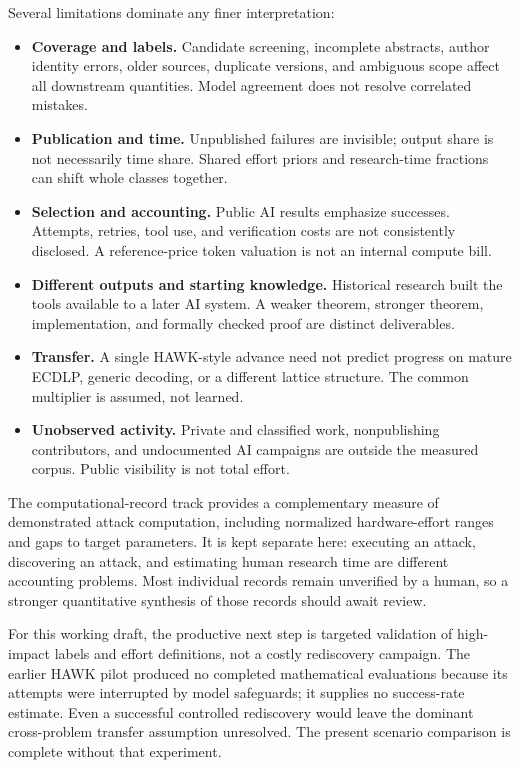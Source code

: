 \documentclass[11pt,letterpaper]{article}
\begin{document}
Several limitations dominate any finer interpretation:
\begin{itemize}
\item \textbf{Coverage and labels.} Candidate screening, incomplete abstracts, author identity errors, older sources, duplicate versions, and ambiguous scope affect all downstream quantities. Model agreement does not resolve correlated mistakes.
\item \textbf{Publication and time.} Unpublished failures are invisible; output share is not necessarily time share. Shared effort priors and research-time fractions can shift whole classes together.
\item \textbf{Selection and accounting.} Public AI results emphasize successes. Attempts, retries, tool use, and verification costs are not consistently disclosed. A reference-price token valuation is not an internal compute bill.
\item \textbf{Different outputs and starting knowledge.} Historical research built the tools available to a later AI system. A weaker theorem, stronger theorem, implementation, and formally checked proof are distinct deliverables.
\item \textbf{Transfer.} A single HAWK-style advance need not predict progress on mature ECDLP, generic decoding, or a different lattice structure. The common multiplier is assumed, not learned.
\item \textbf{Unobserved activity.} Private and classified work, nonpublishing contributors, and undocumented AI campaigns are outside the measured corpus. Public visibility is not total effort.
\end{itemize}
The computational-record track provides a complementary measure of demonstrated attack computation, including normalized hardware-effort ranges and gaps to target parameters. It is kept separate here: executing an attack, discovering an attack, and estimating human research time are different accounting problems. Most individual records remain unverified by a human, so a stronger quantitative synthesis of those records should await review.

For this working draft, the productive next step is targeted validation of high-impact labels and effort definitions, not a costly rediscovery campaign. The earlier HAWK pilot produced no completed mathematical evaluations because its attempts were interrupted by model safeguards; it supplies no success-rate estimate. Even a successful controlled rediscovery would leave the dominant cross-problem transfer assumption unresolved. The present scenario comparison is complete without that experiment.
\end{document}
